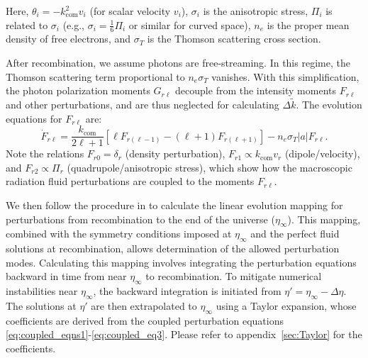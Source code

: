 \documentclass[%
 reprint,
 amsmath,amssymb,
 prd, %
]{revtex4-2}
\begin{document}
Here, $\theta_i = -k_{\mathrm{com}}^2 v_i$ (for scalar velocity $v_i$), $\sigma_i$ is the anisotropic stress, $\Pi_i$ is related to $\sigma_i$ (e.g., $\sigma_i = \frac{1}{6}\Pi_i$ or similar for curved space), $n_e$ is the proper mean density of free electrons, and $\sigma_T$ is the Thomson scattering cross section. %

After recombination, we assume photons are free-streaming. In this regime, the Thomson scattering term proportional to $n_e\sigma_T$ vanishes. %
With this simplification, the photon polarization moments $G_{r\ell}$ decouple from the intensity moments $F_{r\ell}$ and other perturbations, and are thus neglected for calculating $\Delta \tilde k$. %
The evolution equations for $F_{r\ell}$ are: %
\begin{equation}\label{eq:coupled_eq3}
    \dot{F}_{r\ell} =\frac{k_{\mathrm{com}}}{2\ell+1}[\ell F_{r(\ell -1)}-(\ell +1)F_{r(\ell+1)}] - n_e\sigma_T |a| F_{r\ell}.
\end{equation}
Note the relations $F_{r0}=\delta_r$ (density perturbation), $F_{r1} \propto k_{\mathrm{com}}v_r$ (dipole/velocity), and $F_{r2} \propto \Pi_r$ (quadrupole/anisotropic stress), which show how the macroscopic radiation fluid perturbations are coupled to the moments $F_{r\ell}$. %

We then follow the procedure in \cite{2022PhRvD.105l3508P} to calculate the linear evolution mapping for perturbations from recombination to the end of the universe ($\eta_\infty$). %
This mapping, combined with the symmetry conditions imposed at $\eta_\infty$ and the perfect fluid solutions at recombination, allows determination of the allowed perturbation modes. Calculating this mapping involves integrating the perturbation equations backward in time from near $\eta_\infty$ to recombination. To mitigate numerical instabilities near $\eta_\infty$, the backward integration is initiated from $\eta'=\eta_\infty-\Delta \eta$. The solutions at $\eta'$ are then extrapolated to $\eta_\infty$ using a Taylor expansion, whose coefficients are derived from the coupled perturbation equations \eqref{eq:coupled_eqns1}-\eqref{eq:coupled_eq3}. Please refer to appendix~\cref{sec:Taylor} for the coefficients. %
\end{document}
